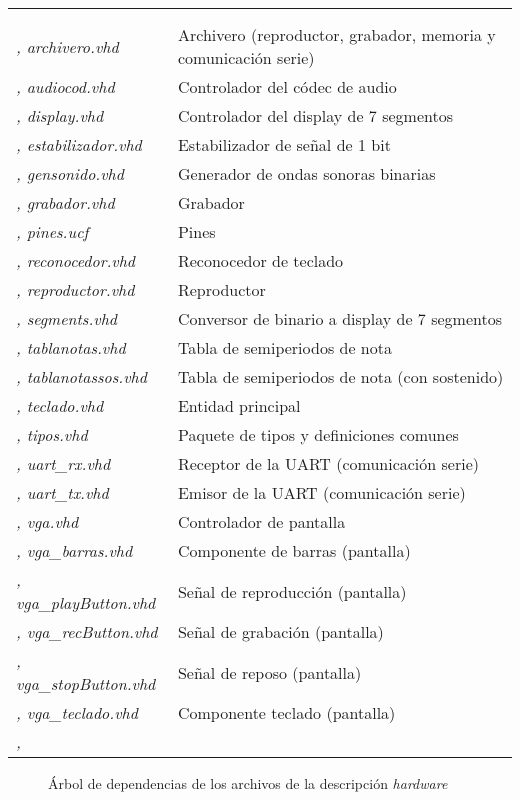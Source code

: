 \documentclass{article}
\begin{document}
\begin{tabu}{| >{\itshape}X[5, l] | X[14, l] |}
	 \\
	 \\ \sep
	archivero.vhd & Archivero (reproductor, grabador, memoria y comunicación serie) \\ \sep
	audiocod.vhd & Controlador del códec de audio \\ \sep
	display.vhd & Controlador del display de 7 segmentos \\ \sep
	estabilizador.vhd & Estabilizador de señal de 1 bit \\ \sep
	gensonido.vhd & Generador de ondas sonoras binarias \\ \sep
	grabador.vhd & Grabador \\ \sep
	pines.ucf & Pines \\ \sep
	reconocedor.vhd & Reconocedor de teclado \\ \sep
	reproductor.vhd & Reproductor \\ \sep
	segments.vhd & Conversor de binario a display de 7 segmentos \\ \sep
	tablanotas.vhd & Tabla de semiperiodos de nota \\ \sep
	tablanotassos.vhd & Tabla de semiperiodos de nota (con sostenido) \\ \sep
	teclado.vhd & Entidad principal \\ \sep
	tipos.vhd & Paquete de tipos y definiciones comunes \\ \sep
	uart\_rx.vhd & Receptor de la UART (comunicación serie) \\ \sep
	uart\_tx.vhd & Emisor de la UART (comunicación serie) \\ \sep
	vga.vhd & Controlador de pantalla \\ \sep
	vga\_barras.vhd & Componente de barras (pantalla) \\ \sep
	vga\_playButton.vhd & Señal de reproducción (pantalla) \\ \sep
	vga\_recButton.vhd & Señal de grabación (pantalla) \\ \sep
	vga\_stopButton.vhd & Señal de reposo (pantalla) \\ \sep
	vga\_teclado.vhd & Componente teclado (pantalla) \\ \sep
\end{tabu}

\begin{figure}[t] \centering
{}
\caption{Árbol de dependencias de los archivos de la descripción {\itshape hardware}}
\end{figure}
\end{document}
